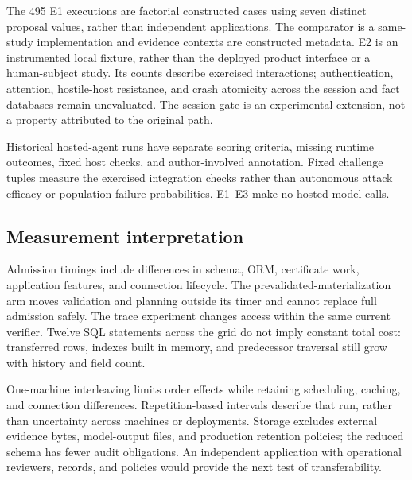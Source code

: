 The 495 E1 executions are factorial constructed cases using seven distinct proposal values, rather than independent applications. The comparator is a same-study implementation and evidence contexts are constructed metadata. E2 is an instrumented local fixture, rather than the deployed product interface or a human-subject study. Its counts describe exercised interactions; authentication, attention, hostile-host resistance, and crash atomicity across the session and fact databases remain unevaluated. The session gate is an experimental extension, not a property attributed to the original path.

Historical hosted-agent runs have separate scoring criteria, missing runtime outcomes, fixed host checks, and author-involved annotation. Fixed challenge tuples measure the exercised integration checks rather than autonomous attack efficacy or population failure probabilities. E1--E3 make no hosted-model calls.

\subsection{Measurement interpretation}

Admission timings include differences in schema, ORM, certificate work, application features, and connection lifecycle. The prevalidated-materialization arm moves validation and planning outside its timer and cannot replace full admission safely. The trace experiment changes access within the same current verifier. Twelve SQL statements across the grid do not imply constant total cost: transferred rows, indexes built in memory, and predecessor traversal still grow with history and field count.

One-machine interleaving limits order effects while retaining scheduling, caching, and connection differences. Repetition-based intervals describe that run, rather than uncertainty across machines or deployments. Storage excludes external evidence bytes, model-output files, and production retention policies; the reduced schema has fewer audit obligations. An independent application with operational reviewers, records, and policies would provide the next test of transferability.

